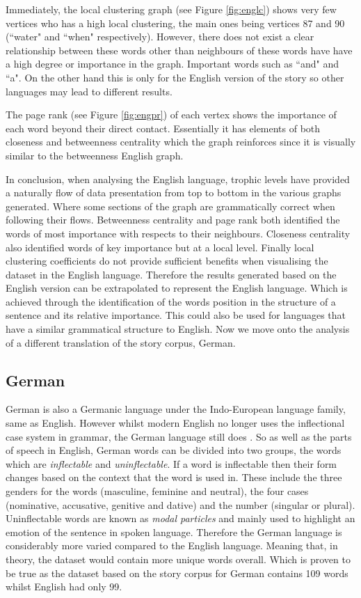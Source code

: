 Immediately, the local clustering graph (see Figure \ref{fig:englc}) shows very few vertices who has a high local clustering, the main ones being vertices 87 and 90 (``water" and ``when" respectively). However, there does not exist a clear relationship between these words other than neighbours of these words have have a high degree or importance in the graph. Important words such as ``and" and ``a". On the other hand this is only for the English version of the story so other languages may lead to different results. 

The page rank (see Figure \ref{fig:engpr}) of each vertex shows the importance of each word beyond their direct contact. Essentially it has elements of both closeness and betweenness centrality which the graph reinforces since it is visually similar to the betweenness English graph.

In conclusion, when analysing the English language, trophic levels have provided a naturally flow of data presentation from top to bottom in the various graphs generated. Where some sections of the graph are grammatically correct when following their flows. Betweenness centrality and page rank both identified the words of most importance with respects to their neighbours. Closeness centrality also identified words of key importance but at a local level. Finally local clustering coefficients do not provide sufficient benefits when visualising the dataset in the English language. Therefore the results generated based on the English version can be extrapolated to represent the English language. Which is achieved through the identification of the words position in the structure of a sentence and its relative importance. This could also be used for languages that have a similar grammatical structure to English. Now we move onto the analysis of a different translation of the story corpus, German.

\subsection{German}
German is also a Germanic language under the Indo-European language family, same as English. However whilst modern English no longer uses the inflectional case system in grammar, the German language still does \cite{durrell2011hammer}. So as well as the parts of speech in English, German words can be divided into two groups, the words which are \emph{inflectable} and \emph{uninflectable}. If a word is inflectable then their form changes based on the context that the word is used in. These include the three genders for the words (masculine, feminine and neutral), the four cases (nominative, accusative, genitive and dative) and the number (singular or plural). Uninflectable words are known as \emph{modal particles} and mainly used to highlight an emotion of the sentence in spoken language. Therefore the German language is considerably more varied compared to the English language. Meaning that, in theory, the dataset would contain more unique words overall. Which is proven to be true as the dataset based on the story corpus for German contains 109 words whilst English had only 99.

